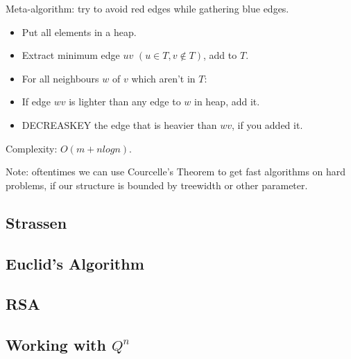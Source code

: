 \begin{multicols}{3}




Meta-algorithm: try to avoid red edges while gathering blue edges.

\begin{itemize}
\item Put all elements in a heap.
\item Extract minimum edge $uv$ $(u ∈ T, v ∉ T)$, add to $T$.
\item For all neighbours $w$ of $v$ which aren't in $T$:
\item If edge $wv$ is lighter than any edge to $w$ in heap, add it.
\item DECREASKEY the edge that is heavier than $wv$, if you added it.
\end{itemize}

Complexity: $O(m + n log n)$.

Note: oftentimes we can use Courcelle's Theorem to get fast algorithms
on hard problems, if our structure is bounded by treewidth or other parameter.



\subsection{Strassen}

\subsection{Euclid's Algorithm}

\subsection{RSA}

\subsection{Working with $Q^n$}



\end{multicols}
